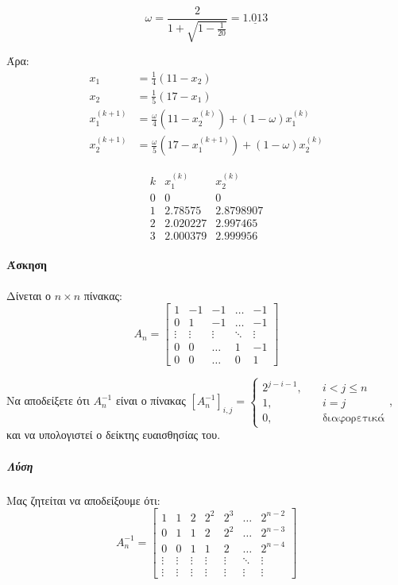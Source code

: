 \documentclass[11pt,a4paper,notitlepage,fleqn,final]{article}
\begin{document}
\[
\omega = \frac{2}{1+\sqrt{1-\frac{1}{20}}} = \underline{1.013}
\]

Άρα:
\begin{align*}
	x_1 &= \frac{1}{4} (11-x_2) \\
	x_2 &= \frac{1}{5} (17-x_1) \\[3ex]
	x_1^{(k+1)} &= \frac{\omega }{4} \left(11-x_2^{(k)}\right)
	+ (1-\omega )x_1^{(k)} \\
	x_2^{(k+1)} &= \frac{\omega }{5} \left(17-x_1^{(k+1)}\right)
	+ (1-\omega )x_2^{(k)}
\end{align*}

\[
\begin{array}{ccc}
	k & x_1^{(k)} & x_2^{(k)} \\ \hline
	0 &     0     &     0     \\
	1 &  2.78575  & 2.8798907 \\
	2 & 2.020227  & 2.997465  \\
	3 & 2.000379  & 2.999956
\end{array}
\]

\paragraph{Άσκηση}
Δίνεται ο \( n\times n \) πίνακας:
\[
A_n = \left[\begin{matrix}
1 & -1 & -1 & \hdots & -1 \\
0 & 1 & -1 & \hdots & -1 \\
\vdots & \vdots & \vdots & \ddots & \vdots \\
0 & 0 & \hdots & 1 & -1 \\
0 & 0 & \hdots & 0 & 1
\end{matrix}\right]
\]

Να αποδείξετε ότι \( A_{n}^{-1} \) είναι ο πίνακας
\( \left[ A_n^{-1} \right]_{i,j} = \begin{cases}
2^{j-i-1}, \quad & i<j\leq n \\
1, \quad & i=j \\
0,\quad & \text{διαφορετικά}
\end{cases} \), και να υπολογιστεί ο δείκτης ευαισθησίας του.

\subparagraph{Λύση}
Μας ζητείται να αποδείξουμε ότι:
\[
A_n^{-1} = \left[\begin{matrix}
1 & 1 & 2 & 2^2 & 2^3 & \hdots & 2^{n-2} \\
0 & 1 & 1 & 2 & 2^2 & \hdots & 2^{n-3} \\
0 & 0 & 1 & 1 & 2 & \hdots & 2^{n-4} \\
\vdots & \vdots & \vdots & \vdots &\vdots &\ddots & \vdots \\
\vdots & \vdots & \vdots & \vdots &\vdots &\vdots & \vdots
\end{matrix}\right]
\]
\end{document}
